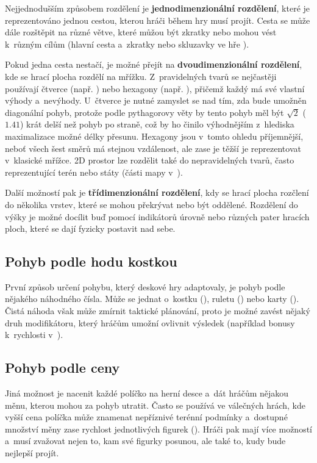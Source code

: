 Nejjednodušším způsobem rozdělení je \textbf{jednodimenzionální rozdělení}, které je reprezentováno jednou cestou, kterou hráči během hry musí projít. Cesta se může dále rozštěpit na různé větve, které můžou být zkratky nebo mohou vést k~různým cílům (hlavní cesta a~zkratky nebo skluzavky ve hře ).

Pokud jedna cesta nestačí, je možné přejít na \textbf{dvoudimenzionální rozdělení}, kde se hrací plocha rozdělí na mřížku. Z~pravidelných tvarů se nejčastěji používají čtverce (např. ) nebo hexagony (např. ), přičemž každý má své vlastní výhody a~nevýhody. U~čtverce je nutné zamyslet se nad tím, zda bude umožněn diagonální pohyb, protože podle pythagorovy věty by tento pohyb měl být $\sqrt{2}$ ($1.41$) krát delší než pohyb po straně, což by ho činilo výhodnějším z~hlediska maximalizace možné délky přesunu. Hexagony jsou v~tomto ohledu příjemnější, neboť všech šest směrů má stejnou vzdálenost, ale zase je těžší je reprezentovat v~klasické mřížce. 2D prostor lze rozdělit také do nepravidelných tvarů, často reprezentující terén nebo státy (části mapy v~).

Další možností pak je \textbf{třídimenzionální rozdělení}, kdy se hrací plocha rozčlení do několika vrstev, které se mohou překrývat nebo být oddělené. Rozdělení do výšky je možné docílit buď pomocí indikátorů úrovně nebo různých pater hracích ploch, které se dají fyzicky postavit nad sebe.

\subsection{Pohyb podle hodu kostkou}
\label{subsec:movement_roll_movement}

První způsob určení pohybu, který deskové hry adaptovaly, je pohyb podle nějakého náhodného čísla. Může se jednat o~kostku (), ruletu () nebo karty (). Čistá náhoda však může zmírnit taktické plánování, proto je možné zavést nějaký druh modifikátoru, který hráčům umožní ovlivnit výsledek (například bonusy k~rychlosti v~).

\subsection{Pohyb podle ceny}
\label{subsec:movement_cost_movement}

Jiná možnost je nacenit každé políčko na herní desce a~dát hráčům nějakou měnu, kterou mohou za pohyb utratit. Často se používá ve válečných hrách, kde vyšší cena políčka může znamenat nepříznivé terénní podmínky a~dostupné množství měny zase rychlost jednotlivých figurek (). Hráči pak mají více možností a~musí zvažovat nejen to, kam své figurky posunou, ale také to, kudy bude nejlepší projít.

